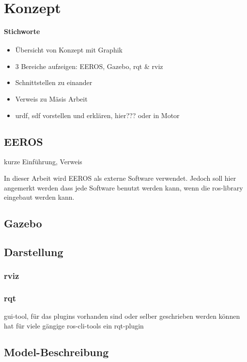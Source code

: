 \chapter{Konzept}
\subsubsection*{Stichworte}
\begin{itemize}
\item Übersicht von Konzept mit Graphik
\item 3 Bereiche aufzeigen: EEROS, Gazebo, rqt \& rviz
\item Schnittstellen zu einander
\item Verweis zu Mäsis Arbeit
\item urdf, sdf vorstellen und erklären, hier??? oder in Motor
\end{itemize}


\section{EEROS}
kurze Einführung, Verweis

In dieser Arbeit wird EEROS als externe Software verwendet.
Jedoch soll hier angemerkt werden dass jede Software benutzt werden kann, wenn die ros-library eingebaut werden kann.

\section{Gazebo}

\section{Darstellung}
\subsection{rviz}
\subsection{rqt}
gui-tool, für das plugins vorhanden sind oder selber geschrieben werden können
hat für viele gängige ros-cli-tools ein rqt-plugin


\section{Model-Beschreibung}

